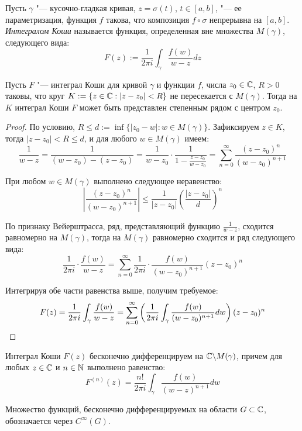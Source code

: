 \begin{definition}
	Пусть $\gamma$ "--- кусочно-гладкая кривая, $z = \sigma(t)$, $t \in [a, b]$, "--- ее параметризация, функция $f$ такова, что композиция $f\circ\sigma$ непрерывна на $[a, b]$. \textit{Интегралом Коши} называется функция, определенная вне множества $M(\gamma)$, следующего вида:
	\[F(z) := \frac1{2\pi i}\int_\gamma \frac{f(w)}{w - z}dz\]
\end{definition}

\begin{theorem}
	Пусть $F$ "--- интеграл Коши для кривой $\gamma$ и функции $f$, числа $z_0 \in \mathbb{C}$, $R > 0$ таковы, что круг $K := \{z \in \mathbb{C}: |z - z_0| < R\}$ не пересекается с $M(\gamma)$. Тогда на $K$ интеграл Коши $F$ может быть представлен степенным рядом с центром $z_0$.
\end{theorem}

\begin{proof}
	По условию, $R \le d := \inf\{|z_0 - w| : w \in M(\gamma)\}$. Зафиксируем $z \in K$, тогда $|z - z_0| < R \le d$, и для любого $w \in M(\gamma)$ имеем:
	\[\frac1{w - z} = \frac1{(w-z_0) - (z - z_0)} = \frac1{w-z_0}\cdot \frac1{1 - \frac{z-z_0}{w - z_0}} = \sum_{n=0}^\infty\frac{(z-z_0)^n}{(w-z_0)^{n + 1}}\]
	
	При любом $w \in M(\gamma)$ выполнено следующее неравенство:
	\[\left|\frac{(z-z_0)^n}{(w-z_0)^{n + 1}}\right| \le \frac{1}{|z - z_0|}\left(\frac{|z - z_0|}{d}\right)^n\]
	
	По признаку Вейерштрасса, ряд, представляющий функцию $\frac1{w - z}$, сходится равномерно на $M(\gamma)$, тогда на $M(\gamma)$ равномерно сходится и ряд следующего вида:
	\[\frac1{2\pi i} \cdot\frac{f(w)}{w-z} = \sum_{n=0}^\infty\frac1{2\pi i}\cdot \frac{f(w)}{(w-z_0)^{n + 1}}(z-z_0)^n\]
	
	Интегрируя обе части равенства выше, получим требуемое:
	\[F(z) = \frac1{2\pi i} \int_\gamma \frac{f(w)}{w-z} = \sum_{n=0}^\infty\left(\frac1{2\pi i} \int_\gamma\frac{f(w)}{(w-z_0)^{n + 1}}dw\right)(z-z_0)^n \qedhere\]
\end{proof}

\begin{corollary}
	Интеграл Коши $F(z)$ бесконечно дифференцируем на $\mathbb{C} \backslash M(\gamma)$, причем для любых $z \in \mathbb{C}$ и $n \in \mathbb{N}$ выполнено равенство:
	\[F^{(n)}(z) = \frac{n!}{2\pi i} \int_\gamma\frac{f(w)}{(w-z)^{n + 1}}dw\]
\end{corollary}

\begin{definition}
	Множество функций, бесконечно дифференцируемых на области $G \subset \mathbb{C}$, обозначается через $C^\infty(G)$.
\end{definition}

